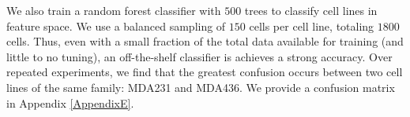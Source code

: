 We also train a random forest classifier with $500$ trees to classify cell lines in feature space. We use a balanced sampling of $150$ cells per cell line, totaling $1800$ cells. Thus, even with a small fraction of the total data available for training (and little to no tuning), an off-the-shelf classifier is achieves a strong accuracy. Over repeated experiments, we find that the greatest confusion occurs between two cell lines of the same family: MDA231 and MDA436. We provide a confusion matrix in Appendix \ref{AppendixE}.

\begin{figure}
\centering
{} %

\begin{tikzpicture}[x=0.75pt,y=0.75pt,yscale=-1,xscale=1]


\end{tikzpicture}
\end{figure}
